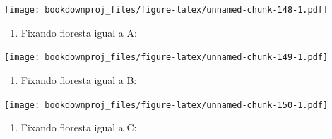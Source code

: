 \documentclass[
]{article}
\newenvironment{Shaded}{\begin{snugshade}}{\end{snugshade}}
\newcommand{\DataTypeTok}[1]{\textcolor[rgb]{0.13,0.29,0.53}{#1}}
\newcommand{\DecValTok}[1]{\textcolor[rgb]{0.00,0.00,0.81}{#1}}
\newcommand{\KeywordTok}[1]{\textcolor[rgb]{0.13,0.29,0.53}{\textbf{#1}}}
\newcommand{\NormalTok}[1]{#1}
\newcommand{\OperatorTok}[1]{\textcolor[rgb]{0.81,0.36,0.00}{\textbf{#1}}}
\newcommand{\StringTok}[1]{\textcolor[rgb]{0.31,0.60,0.02}{#1}}
\providecommand{\tightlist}{%
  \setlength{\itemsep}{0pt}\setlength{\parskip}{0pt}}
\begin{document}
\begin{Shaded}
\end{Shaded}

\texttt{[image: bookdownproj\_files/figure-latex/unnamed-chunk-148-1.pdf]}

\begin{enumerate}
\def\labelenumi{\arabic{enumi}.}
\setcounter{enumi}{6}
\tightlist
\item
  Fixando floresta igual a A:
\end{enumerate}

\begin{Shaded}
\end{Shaded}

\texttt{[image: bookdownproj\_files/figure-latex/unnamed-chunk-149-1.pdf]}

\begin{enumerate}
\def\labelenumi{\arabic{enumi}.}
\setcounter{enumi}{7}
\tightlist
\item
  Fixando floresta igual a B:
\end{enumerate}

\begin{Shaded}
\end{Shaded}

\texttt{[image: bookdownproj\_files/figure-latex/unnamed-chunk-150-1.pdf]}

\begin{enumerate}
\def\labelenumi{\arabic{enumi}.}
\setcounter{enumi}{8}
\tightlist
\item
  Fixando floresta igual a C:
\end{enumerate}
\end{document}
